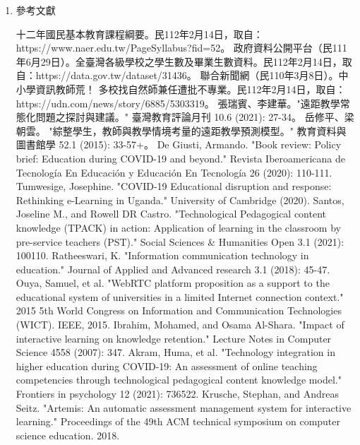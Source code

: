 \documentclass[12pt]{article}
\begin{document}
\begin{enumerate}
  \item 參考文獻
    \renewcommand{\section}[2]{}
    \begin{thebibliography}{99}
       十二年國民基本教育課程綱要。民112年2月14日，取自：https://www.naer.edu.tw/PageSyllabus?fid=52。
       政府資料公開平台（民111年6月29日）。全臺灣各級學校之學生數及畢業生數資料。民112年2月14日，取自：https://data.gov.tw/dataset/31436。
       聯合新聞網（民110年3月8日）。中小學資訊教師荒！ 多校找自然師兼任遭批不專業。民112年2月14日，取自：https://udn.com/news/story/6885/5303319。
       張瑞賓、李建華。"遠距教學常態化問題之探討與建議。" 臺灣教育評論月刊 10.6 (2021): 27-34。
       岳修平、梁朝雲。 "綜整學生，教師與教學情境考量的遠距教學預測模型。" 教育資料與圖書館學 52.1 (2015): 33-57+。
       De Giusti, Armando. "Book review: Policy brief: Education during COVID-19 and beyond." Revista Iberoamericana de Tecnología En Educación y Educación En Tecnología 26 (2020): 110-111.
       Tumwesige, Josephine. "COVID-19 Educational disruption and response: Rethinking e-Learning in Uganda." University of Cambridge (2020).
       Santos, Joseline M., and Rowell DR Castro. "Technological Pedagogical content knowledge (TPACK) in action: Application of learning in the classroom by pre-service teachers (PST)." Social Sciences \& Humanities Open 3.1 (2021): 100110.
       Ratheeswari, K. "Information communication technology in education." Journal of Applied and Advanced research 3.1 (2018): 45-47.
       Ouya, Samuel, et al. "WebRTC platform proposition as a support to the educational system of universities in a limited Internet connection context." 2015 5th World Congress on Information and Communication Technologies (WICT). IEEE, 2015.
       Ibrahim, Mohamed, and Osama Al-Shara. "Impact of interactive learning on knowledge retention." Lecture Notes in Computer Science 4558 (2007): 347.
       Akram, Huma, et al. "Technology integration in higher education during COVID-19: An assessment of online teaching competencies through technological pedagogical content knowledge model." Frontiers in psychology 12 (2021): 736522.
       Krusche, Stephan, and Andreas Seitz. "Artemis: An automatic assessment management system for interactive learning." Proceedings of the 49th ACM technical symposium on computer science education. 2018.

\end{thebibliography}
\end{enumerate}
\end{document}

